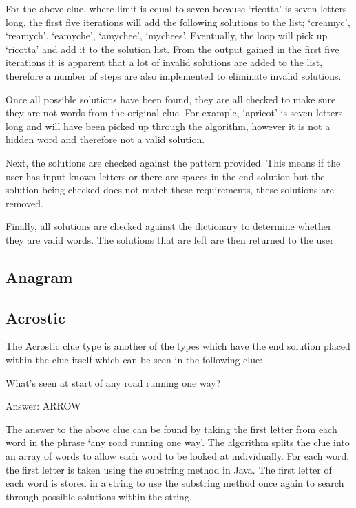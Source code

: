For the above clue, where limit is equal to seven because `ricotta' is seven
letters  long, the first five iterations will add the following solutions to the
list; `creamyc',  `reamych', `eamyche', `amychee', `mychees'. Eventually, the
loop will pick up  `ricotta' and add it to the solution list. From the output
gained in the first five  iterations it is apparent that a lot of invalid
solutions are added to the list, therefore a number of steps are also
implemented to eliminate invalid solutions.

Once all possible solutions have been found, they are all checked to make sure
they are not words from the original clue. For example, `apricot' is seven
letters long and will  have been picked up through the algorithm, however it is
not a hidden word and therefore  not a valid solution.

Next, the solutions are checked against the pattern provided. This means if the
user  has input known letters or there are spaces in the end solution but the
solution being  checked does not match these requirements, these solutions are
removed.

Finally, all solutions are checked against the dictionary to determine whether
they  are valid words. The solutions that are left are then returned to the
user.

\subsection{Anagram}

\subsection{Acrostic}

The Acrostic clue type is another of the types which have the end solution
placed within  the clue itself which can be seen in the following clue:

What's seen at start of any road running one way?

Answer: ARROW

The answer to the above clue can be found by taking the first letter from each
word in  the phrase `any road running one way'. The algorithm splits the clue
into an array of words  to allow each word to be looked at individually. For
each word, the first letter is taken using the substring method in Java. The 
first letter of each word is stored in a string to use the substring method 
once again to search through possible solutions within the string.

